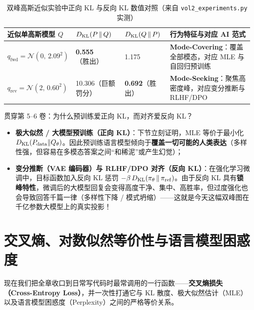 \begin{table}[htbp]
  \centering
  \caption{双峰高斯近似实验中正向 KL 与反向 KL 数值对照（来自 \texttt{vol2\_experiments.py} 实测）}
  \label{tab:ch4-kl-bimodal}
  \small
  \begin{tabularx}{\linewidth}{@{}p{34mm}p{24mm}p{24mm}X@{}}
    \toprule
    \textbf{近似单高斯模型 $Q$} & $D_{\mathrm{KL}}(P \,\|\, Q)$ & $D_{\mathrm{KL}}(Q \,\|\, P)$ & \textbf{行为特征与对应 AI 范式} \\
    \midrule
    $q_{\mathrm{fwd}} = \mathcal{N}(0,\, 2.09^2)$ & \textbf{0.555}（胜出） & 1.175 & \textbf{Mode-Covering}：覆盖全部模态，对应 MLE 与自回归预训练 \\
    $q_{\mathrm{rev}} = \mathcal{N}(2,\, 0.60^2)$ & 10.306（巨额罚分） & \textbf{0.692}（胜出） & \textbf{Mode-Seeking}：聚焦高密度峰，对应变分推断与 RLHF/DPO \\
    \bottomrule
  \end{tabularx}
\end{table}

\begin{insightBox}{贯穿第 5--6 卷：为什么预训练爱正向 KL，而对齐爱反向 KL？}
\begin{itemize}
  \item \textbf{极大似然 / 大模型预训练（正向 KL）}：下节立刻证明，MLE 等价于最小化 $D_{\mathrm{KL}}(P_{\mathrm{data}}\|Q_\theta)$。因此预训练语言模型倾向于\textbf{覆盖一切可能的人类表达}（多样性强，但容易在多模态答案之间“和稀泥”或产生幻觉）；
  \item \textbf{变分推断（VAE 编码器）与 RLHF/DPO 对齐（反向 KL）}：在强化学习微调中，目标函数加入反向 KL 惩罚 $-\beta\,D_{\mathrm{KL}}(\pi_\theta \,\|\, \pi_{\mathrm{ref}})$。由于反向 KL 具有\textbf{锁峰特性}，微调后的大模型回复会变得高度干净、集中、高胜率，但过度强化也会导致回答千篇一律（多样性下降 / 模式坍缩）——这就是今天这幅双峰图在千亿参数大模型上的真实投影！
\end{itemize}
\end{insightBox}

\section{交叉熵、对数似然等价性与语言模型困惑度}
\label{sec:ch4-ce-ppl}

现在我们把全章收口到日常写代码时最常调用的一行函数——\textbf{交叉熵损失（Cross-Entropy Loss）}，并一次性打通它与 KL 散度、极大似然估计（MLE）以及语言模型困惑度（Perplexity）之间的严格等价关系。

